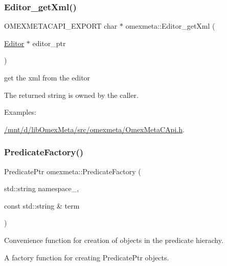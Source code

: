 \subsubsection{\texorpdfstring{Editor\+\_\+get\+Xml()}{Editor\_getXml()}}
{\footnotesize\ttfamily O\+M\+E\+X\+M\+E\+T\+A\+C\+A\+P\+I\+\_\+\+E\+X\+P\+O\+RT char $\ast$ omexmeta\+::\+Editor\+\_\+get\+Xml (\begin{DoxyParamCaption}\item[{\hyperlink{classomexmeta_1_1Editor}{Editor} $\ast$}]{editor\+\_\+ptr }\end{DoxyParamCaption})}



get the xml from the editor 

The returned string is owned by the caller. \begin{Desc}
\item[Examples\+: ]\par
\hyperlink{_2mnt_2d_2libOmexMeta_2src_2omexmeta_2OmexMetaCApi_8h-example}{/mnt/d/lib\+Omex\+Meta/src/omexmeta/\+Omex\+Meta\+C\+Api.\+h}.\end{Desc}
\mbox{\label{namespaceomexmeta_a0a8d50daa10e421d0722520cdef0ab9a}} 
\subsubsection{\texorpdfstring{Predicate\+Factory()}{PredicateFactory()}}
{\footnotesize\ttfamily Predicate\+Ptr omexmeta\+::\+Predicate\+Factory (\begin{DoxyParamCaption}\item[{std\+::string}]{namespace\+\_\+,  }\item[{const std\+::string \&}]{term }\end{DoxyParamCaption})}



Convenience function for creation of objects in the predicate hierachy. 

A factory function for creating Predicate\+Ptr objects.


